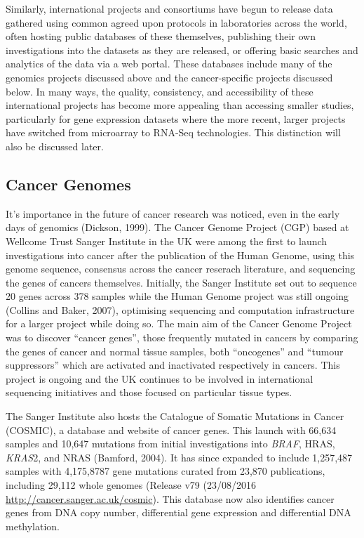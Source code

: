 Similarly, international projects and consortiums have begun to release data gathered using common agreed upon protocols in laboratories across the world, often hosting public databases of these themselves, publishing their own investigations into the datasets as they are released, or offering basic searches and analytics of the data via a web portal. These databases include many of the genomics projects discussed above and the cancer-specific projects discussed below. In many ways, the quality, consistency, and accessibility of these international projects has become more appealing than accessing smaller studies, particularly for gene expression datasets where the more recent, larger projects have switched from microarray to RNA-Seq technologies. This distinction will also be discussed later.

\subsection{Cancer Genomes}
It's importance in the future of cancer research was noticed, even in the early days of genomics (Dickson, 1999). The Cancer Genome Project (CGP) based at Wellcome Trust Sanger Institute in the UK were among the first to launch investigations into cancer after the publication of the Human Genome, using this genome sequence, consensus across the cancer reserach literature, and sequencing the genes of cancers themselves. Initially, the Sanger Institute set out to sequence 20 genes across 378 samples while the Human Genome project was still ongoing (Collins and Baker, 2007), optimising sequencing and computation infrastructure for a larger project while doing so. The main aim of the Cancer Genome Project was to discover ``cancer genes'', those frequently mutated in cancers by comparing the genes of cancer and normal tissue samples, both ``oncogenes'' and ``tumour suppressors'' which are activated and inactivated respectively in cancers. This project is ongoing and the UK continues to be involved in international sequencing initiatives and those focused on particular tissue types.

The Sanger Institute also hosts the Catalogue of Somatic Mutations in Cancer (COSMIC), a database and website of cancer genes. This launch with 66,634 samples and 10,647 mutations from initial investigations into \textit{BRAF}, HRAS, \textit{KRAS}2, and NRAS (Bamford, 2004). It has since expanded to include 1,257,487 samples with 4,175,8787 gene mutations curated from 23,870 publications, including 29,112 whole genomes (Release v79 (23/08/2016 \url{http://cancer.sanger.ac.uk/cosmic}). This database now also identifies cancer genes from DNA copy number, differential gene expression and differential DNA methylation.

